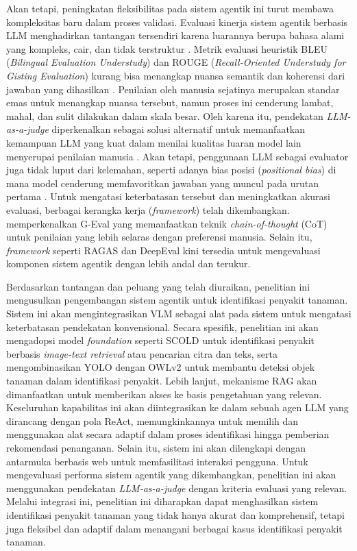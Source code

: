 Akan tetapi, peningkatan fleksibilitas pada sistem agentik ini turut membawa kompleksitas baru dalam proses validasi. Evaluasi kinerja sistem agentik berbasis LLM menghadirkan tantangan tersendiri karena luarannya berupa bahasa alami yang kompleks, cair, dan tidak terstruktur \parencite{liuGEvalNLGEvaluation2023}. Metrik evaluasi heuristik BLEU (\textit{Bilingual Evaluation Understudy}) dan ROUGE (\textit{Recall-Oriented Understudy for Gisting Evaluation}) kurang bisa menangkap nuansa semantik dan koherensi dari jawaban yang dihasilkan \parencite{saiSurveyEvaluationMetrics2022}. Penilaian oleh manusia sejatinya merupakan standar emas untuk menangkap nuansa tersebut, namun proses ini cenderung lambat, mahal, dan sulit dilakukan dalam skala besar. Oleh karena itu, pendekatan \textit{LLM-as-a-judge} diperkenalkan sebagai solusi alternatif untuk memanfaatkan kemampuan LLM yang kuat dalam menilai kualitas luaran model lain menyerupai penilaian manusia \parencite{liGenerationJudgmentOpportunities2025}. Akan tetapi, penggunaan LLM sebagai evaluator juga tidak luput dari kelemahan, seperti adanya bias posisi (\textit{positional bias}) di mana model cenderung memfavoritkan jawaban yang muncul pada urutan pertama \parencite{wangLargeLanguageModels2024}. Untuk mengatasi keterbatasan tersebut dan meningkatkan akurasi evaluasi, berbagai kerangka kerja (\textit{framework}) telah dikembangkan. \textcite{liuGEvalNLGEvaluation2023} memperkenalkan G-Eval yang memanfaatkan teknik \textit{chain-of-thought} (CoT) untuk penilaian yang lebih selaras dengan preferensi manusia. Selain itu, \textit{framework} seperti RAGAS \parencite{esRagasAutomatedEvaluation2025} dan DeepEval \parencite{confidentaiDeepEval2025} kini tersedia untuk mengevaluasi komponen sistem agentik dengan lebih andal dan terukur.

Berdasarkan tantangan dan peluang yang telah diuraikan, penelitian ini mengusulkan pengembangan sistem agentik untuk identifikasi penyakit tanaman. Sistem ini akan mengintegrasikan VLM sebagai alat pada sistem untuk mengatasi keterbatasan pendekatan konvensional. Secara spesifik, penelitian ini akan mengadopsi model \textit{foundation} seperti SCOLD untuk identifikasi penyakit berbasis \textit{image-text retrieval} atau pencarian citra dan teks, serta mengombinasikan YOLO dengan OWLv2 untuk membantu deteksi objek tanaman dalam identifikasi penyakit. Lebih lanjut, mekanisme RAG akan dimanfaatkan untuk memberikan akses ke basis pengetahuan yang relevan. Keseluruhan kapabilitas ini akan diintegrasikan ke dalam sebuah agen LLM yang dirancang dengan pola ReAct, memungkinkannya untuk memilih dan menggunakan alat secara adaptif dalam proses identifikasi hingga pemberian rekomendasi penanganan. Selain itu, sistem ini akan dilengkapi dengan antarmuka berbasis web untuk memfasilitasi interaksi pengguna. Untuk mengevaluasi performa sistem agentik yang dikembangkan, penelitian ini akan menggunakan pendekatan \textit{LLM-as-a-judge} dengan kriteria evaluasi yang relevan. Melalui integrasi ini, penelitian ini diharapkan dapat menghasilkan sistem identifikasi penyakit tanaman yang tidak hanya akurat dan komprehensif, tetapi juga fleksibel dan adaptif dalam menangani berbagai kasus identifikasi penyakit tanaman.

